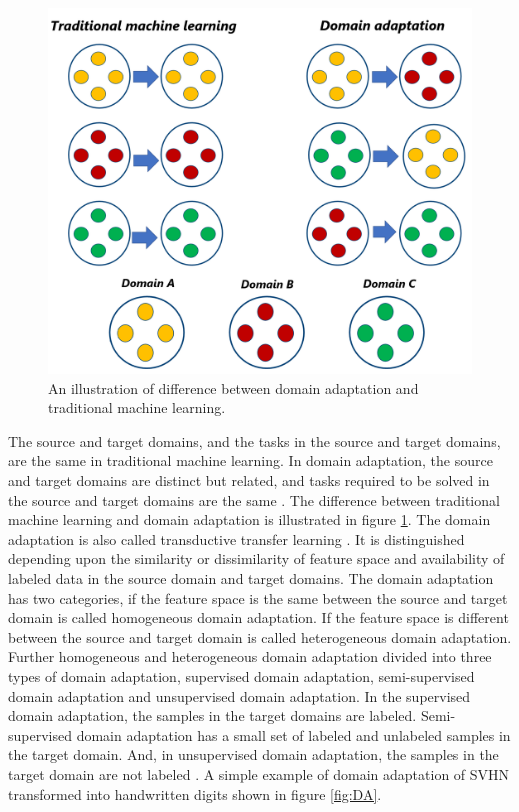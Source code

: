 \begin{figure}[H]
        \begin{center}
	 	    \includegraphics[scale=0.28]{images/Introduction/DomainAdaptation.png}
	    \caption[An illustration of difference between domain adaptation and traditional machine learning.]{An illustration of difference between domain adaptation and traditional machine learning.}
	    \label{fig:DomainAdaptation}
	    \end{center}
\end{figure}

The source and target domains, and the tasks in the source and target domains, are the same in traditional machine learning. In domain adaptation, the source and target domains are distinct but related, and tasks required to be solved in the source and target domains are the same \cite{5288526}. The difference between traditional machine learning and domain adaptation is illustrated in figure \ref{fig:DomainAdaptation}. The domain adaptation is also called transductive transfer learning \cite{5288526}. It is distinguished depending upon the similarity or dissimilarity of feature space and availability of labeled data in the source domain and target domains. The domain adaptation has two categories, if the feature space is the same between the source and target domain is called homogeneous domain adaptation. If the feature space is different between the source and target domain is called heterogeneous domain adaptation. Further homogeneous and heterogeneous domain adaptation divided into three types of domain adaptation, supervised domain adaptation, semi-supervised domain adaptation and unsupervised domain adaptation. In the supervised domain adaptation, the samples in the target domains are labeled. Semi-supervised domain adaptation has a small set of labeled and unlabeled samples in the target domain. And, in unsupervised domain adaptation, the samples in the target domain are not labeled \cite{5288526}. A simple example of domain adaptation of  \ac{SVHN} transformed into handwritten digits shown in figure \ref{fig:DA}.


